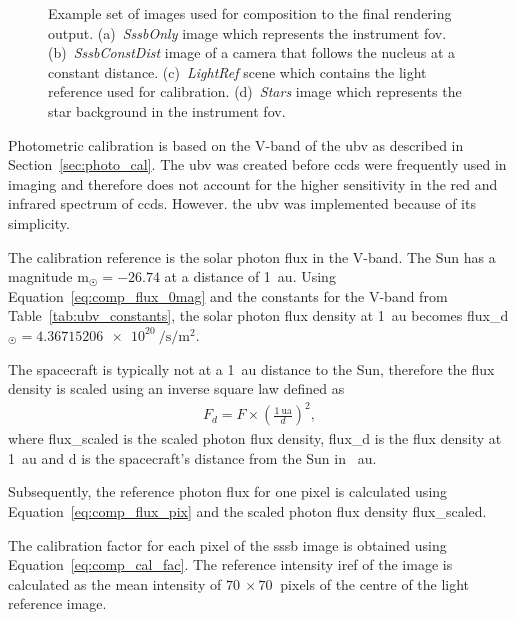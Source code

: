 \begin{figure}[htb]
\begin{subfigure}[b]{0.47\textwidth}
        \caption{}
        \label{fig:comp_stars}
    \end{subfigure}
    \caption{Example set of images used for composition to the final rendering output. (a)~\textit{SssbOnly} image which represents the instrument \gls{fov}. (b)~\textit{SssbConstDist} image of a camera that follows the nucleus at a constant distance. (c)~\textit{LightRef} scene which contains the light reference used for calibration. (d)~\textit{Stars} image which represents the star background in the instrument \gls{fov}.}
    \label{fig:comp_imageset}
\end{figure}

Photometric calibration is based on the V-band of the \gls{ubv} as described in Section~\ref{sec:photo_cal}. The \gls{ubv} was created before \glspl{ccd} were frequently used in imaging and therefore does not account for the higher sensitivity in the red and infrared spectrum of \glspl{ccd}. However. the \gls{ubv} was implemented because of its simplicity.

The calibration reference is the solar photon flux in the V-band. The Sun has a magnitude \gls{m}$_{\astrosun} = -26.74$ at a distance of \SI{1}{\astronomicalunit}. Using Equation~\ref{eq:comp_flux_0mag} and the constants for the V-band from Table~\ref{tab:ubv_constants}, the solar photon flux density at \SI{1}{\astronomicalunit} becomes \gls{flux_d}$_{\astrosun} = \SI{4.36715206e+20}{\per\second\per\square\meter}$.
 
The spacecraft is typically not at a \SI{1}{\astronomicalunit} distance to the Sun, therefore the flux density is scaled using an inverse square law defined as
\begin{align}
    F_d = F \times \left(\frac{\SI{1}{\astronomicalunit}}{d}\right)^2, \label{eq:inverse_square}
\end{align}
where \gls{flux_scaled} is the scaled photon flux density, \gls{flux_d} is the flux density at \SI{1}{\astronomicalunit} and \gls{d} is the spacecraft's distance from the Sun in \SI{}{\astronomicalunit}.

Subsequently, the reference photon flux for one pixel is calculated using Equation~\ref{eq:comp_flux_pix} and the scaled photon flux density \gls{flux_scaled}.

The calibration factor for each pixel of the \gls{sssb} image is obtained using Equation~\ref{eq:comp_cal_fac}. The reference intensity \gls{iref} of the image is calculated as the mean intensity of $\SI{70}{}\times\SI{70}{}$ pixels of the centre of the light reference image.

